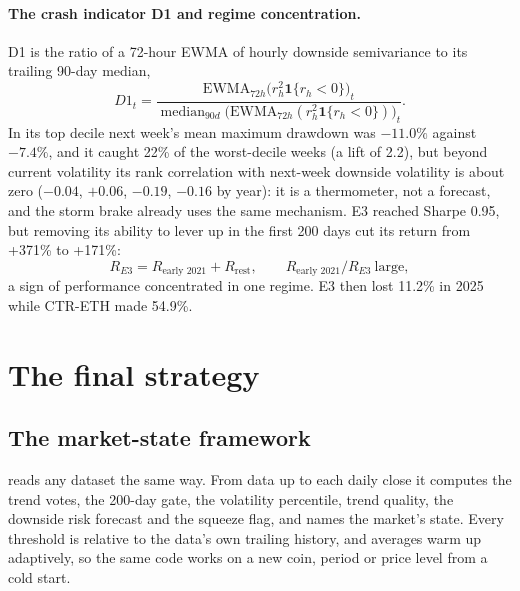 \documentclass[11pt,a4paper]{article}
\newcommand{\repo}{https://github.com/PriyanshuIITGHY2006/InterIIT_Quant_Jain-Streeter}
\newcommand{\file}[1]{\href{\repo/blob/master/#1}{\texttt{\detokenize{#1}}}}
\theoremstyle{definition}
\begin{document}
\paragraph{The crash indicator D1 and regime concentration.} D1 is the ratio of a 72-hour EWMA of hourly downside semivariance to its trailing 90-day median,
\begin{equation}
D1_t=\frac{\mathrm{EWMA}_{72h}\bigl(r_h^2\mathbf 1\{r_h<0\}\bigr)_t}{\operatorname{median}_{90d}\bigl(\mathrm{EWMA}_{72h}(r_h^2\mathbf 1\{r_h<0\})\bigr)_t}.
\end{equation}
In its top decile next week's mean maximum drawdown was $-11.0\%$ against $-7.4\%$, and it caught 22\% of the worst-decile weeks (a lift of 2.2), but beyond current volatility its rank correlation with next-week downside volatility is about zero ($-0.04$, $+0.06$, $-0.19$, $-0.16$ by year): it is a thermometer, not a forecast, and the storm brake already uses the same mechanism.
E3 reached Sharpe 0.95, but removing its ability to lever up in the first 200 days cut its return from +371\% to +171\%:
\begin{equation}
R_{E3}=R_{\text{early 2021}}+R_{\text{rest}},\qquad R_{\text{early 2021}}/R_{E3}\ \text{large},
\end{equation}
a sign of performance concentrated in one regime. E3 then lost 11.2\% in 2025 while CTR-ETH made 54.9\%.

\section{The final strategy}\label{sec:strategy}
\subsection{The market-state framework}
\file{src/strategies/market_state.py} reads any dataset the same way. From data up to each daily close it computes the trend votes, the 200-day gate, the volatility percentile, trend quality, the downside risk forecast and the squeeze flag, and names the market's state. Every threshold is relative to the data's own trailing history, and averages warm up adaptively, so the same code works on a new coin, period or price level from a cold start.
\end{document}
